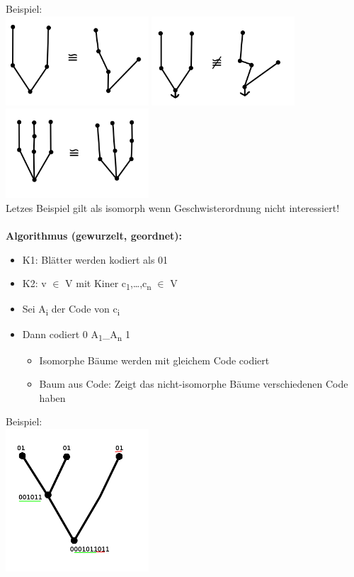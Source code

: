 Beispiel:\\
\includegraphics[width=0.4\textwidth]{lectures/161028/pix/graph1.png}
\includegraphics[width=0.4\textwidth]{lectures/161028/pix/graph2.png}\\
\includegraphics[width=0.4\textwidth]{lectures/161028/pix/graph3.png}\\
Letzes Beispiel gilt als isomorph wenn Geschwisterordnung nicht interessiert!
\\\\
\textbf{Algorithmus (gewurzelt, geordnet):}\newline
\begin{itemize}
	\item K1: Blätter werden kodiert als 01
	\item K2: v $\in$ V mit Kiner c\textsubscript{1},\ldots,c\textsubscript{n} $\in$ V
	\item Sei A\textsubscript{i} der Code von c\textsubscript{i}
	\item Dann codiert 0 A\textsubscript{1}\_A\textsubscript{n} 1
	\begin{itemize}
		\item Isomorphe Bäume werden mit gleichem Code codiert
		\item Baum aus Code: Zeigt das nicht-isomorphe Bäume verschiedenen Code haben
	\end{itemize}
\end{itemize}
Beispiel:\\
\includegraphics[width=0.4\textwidth]{lectures/161028/pix/isomorph.png}
\newpage

